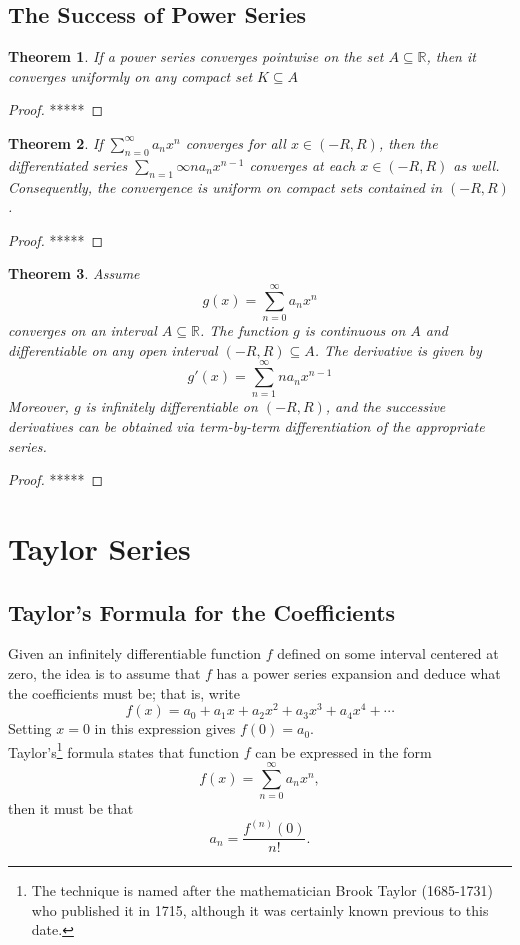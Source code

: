 \documentclass[10pt]{report}
\newtheorem{thm3}{Theorem}[subsection]
\begin{document}
\subsection{The Success of Power Series}
\begin{thm3}
If a power series converges pointwise on the set $A\subseteq \mathbb{R}$, then it converges uniformly on any compact set $K\subseteq A$
\end{thm3}
\begin{proof}
*****
\end{proof}
\begin{thm3}
If $\sum_{n=0}^\infty a_nx^n$ converges for all $x\in (-R,R)$, then the differentiated series $\sum_{n=1}\infty na_nx^{n-1}$ converges at each $x\in (-R,R)$ as well. Consequently, the convergence is uniform on compact sets contained in $(-R,R)$.
\end{thm3}
\begin{proof}
*****
\end{proof}
\begin{thm3}
Assume 
$$g(x)=\sum_{n=0}^\infty a_nx^n$$
converges on an interval $A\subseteq \mathbb{R}$. The function $g$ is continuous on $A$ and differentiable on any open interval $(-R,R)\subseteq A$. The derivative is given by
$$g'(x)=\sum_{n=1}^\infty na_nx^{n-1}$$
Moreover, $g$ is infinitely differentiable on $(-R,R)$, and the successive derivatives can be obtained via term-by-term differentiation of the appropriate series.
\end{thm3}
\begin{proof}
*****
\end{proof}
\section{Taylor Series}
\subsection{Taylor's Formula for the Coefficients}
Given an infinitely differentiable function $f$ defined on some interval centered at zero, the idea is to assume that $f$ has a power series expansion and deduce what the coefficients must be; that is, write
$$f(x) = a_0 + a_1x + a_2x^2 + a_3x^3 + a_4x^4 +\cdots$$
Setting $x=0$ in this expression gives $f(0)=a_0$.\\
Taylor's\footnote{The technique is named after the mathematician Brook Taylor (1685-1731) who published it in 1715, although it was certainly known previous to this date.} formula states that function $f$ can be expressed in the form
$$f(x) = \sum_{n=0}^\infty a_nx^n,$$
then it must be that
$$a_n = \frac{f^{(n)}(0)}{n!}.$$
\end{document}
